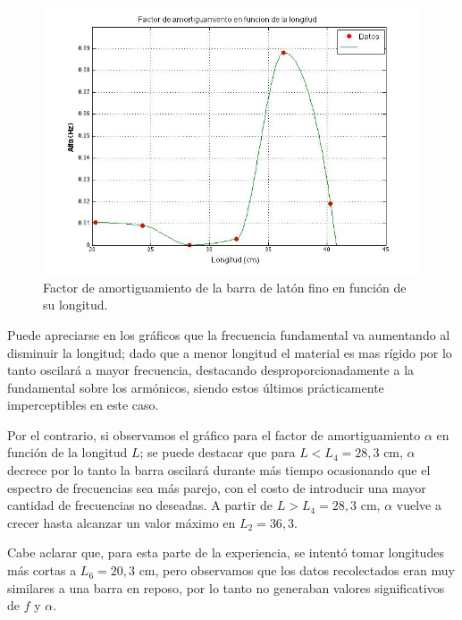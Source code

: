 \documentclass[twoside,twocolumn,a4paper]{article}
\begin{document}
\begin{figure}[H]
\includegraphics[width=\linewidth]{avsl.jpg}
\caption{Factor de amortiguamiento de la barra de lat\'on fino en funci\'on de su longitud.}
\label{fig:avsl}
\end{figure}

Puede apreciarse en los gr\'aficos que la frecuencia fundamental va aumentando al disminuir la longitud; dado que a menor longitud el material es mas r\'igido por lo tanto oscilar\'a a mayor frecuencia, destacando desproporcionadamente a la fundamental sobre los arm\'onicos, siendo estos \'ultimos pr\'acticamente imperceptibles en este caso. \newline

Por el contrario, si observamos el gr\'afico para el factor de amortiguamiento $\alpha$ en funci\'on de la longitud $L$; se puede destacar que para $L < L_{4} = 28,3$ cm, $\alpha$ decrece por lo tanto la barra oscilar\'a durante m\'as tiempo ocasionando que el espectro de frecuencias sea m\'as parejo, con el costo de introducir una mayor cantidad de frecuencias no deseadas.
A partir de $L > L_{4} = 28,3$ cm, $\alpha$ vuelve a crecer hasta alcanzar un valor m\'aximo en $L_{2} = 36,3$.

Cabe aclarar que, para esta parte de la experiencia, se intent\'o tomar longitudes m\'as cortas a $L_{6} = 20,3$ cm, pero observamos que los datos recolectados eran muy similares a una barra en reposo, por lo tanto no generaban valores significativos de $f$ y $\alpha$.

\end{document}

